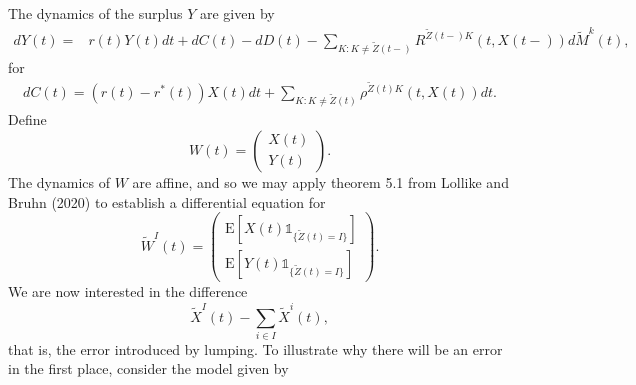 \documentclass[12pt]{article}
\newcommand{\E}{\text{E}}
\newcommand{\indic}[1]{\mathds{1}_{ \{ #1 \} }}
\theoremstyle{my_thm}
\theoremstyle{my_def}
\theoremstyle{my_thm2}
\begin{document}
The dynamics of the surplus $Y$ are given by
\begin{align*}
dY(t)=& r(t) Y(t) dt + dC(t)-dD(t)-
\sum_{K:K \neq \tilde{Z}(t-)}  R^{\tilde{Z}(t-)K}(t,X(t-)) d\tilde{M}^k(t), 
\end{align*}
for 
\begin{gather*}
dC(t)=(r(t)-r^*(t))X(t)dt+\sum_{K:K\neq \tilde{Z}(t)} \rho^{\tilde{Z}(t)K}(t,X(t)) dt.
\end{gather*}
Define
$$
W(t)=\begin{pmatrix}
X(t)\\
Y(t)
\end{pmatrix}.
$$
The dynamics of $W$ are affine, and so we may apply theorem 5.1 from Lollike and Bruhn (2020) to establish a differential equation for 
$$
\tilde{W}^I(t)= \begin{pmatrix}
\E[X(t)\indic{\tilde{Z}(t)=I}]\\
\E[Y(t)\indic{\tilde{Z}(t)=I}]
\end{pmatrix}.
$$
We are now interested in the difference
$$
\tilde{X}^I(t) - \sum_{i \in I} \tilde{X}^i(t),
$$
that is, the error introduced by lumping.
To illustrate why there will be an error in the first place, consider the model given by
\def\sca{3.5}
\def\scaa{0.9}
\begin{figure}[H]
\begin{center}
\end{center}
\end{figure}
\end{document}
